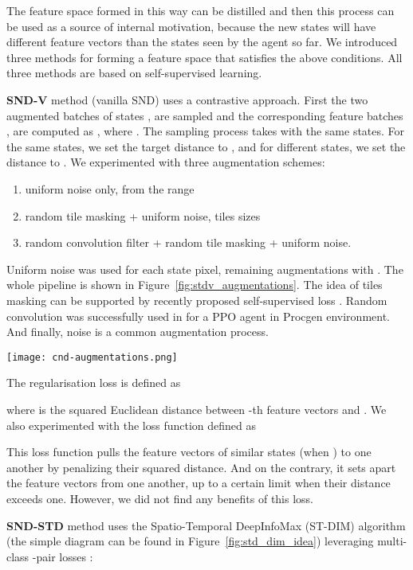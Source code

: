 \documentclass[a4paper,11pt]{elsarticle}
\begin{document}
The feature space formed in this way can be distilled and then this process can be used as a source of internal motivation, because the new states will have different feature vectors than the states seen by the agent so far.
We introduced three methods for forming a feature space that satisfies the above conditions. All three methods are based on self-supervised learning.

\textbf{SND-V} method (vanilla SND) uses a contrastive approach.
First the two augmented batches of states ,  are sampled and the corresponding feature batches ,  are computed as , where .
The sampling process takes with  the same states.
For the same states, we set the target distance to , and for different states, we set the distance to .
We experimented with three augmentation schemes: 
\begin{enumerate}
  \item uniform noise only, from the range 
  \item random tile masking + uniform noise, tiles sizes 
  \item random convolution filter + random tile masking + uniform noise.
\end{enumerate}
Uniform noise was used for each state pixel, remaining augmentations with . The whole pipeline is shown in Figure~\ref{fig:stdv_augmentations}. 
The idea of tiles masking can be supported by recently proposed self-supervised loss \citep{assran2022maskednetworks}. Random convolution was successfully used in \citep{lee2020randomization} for a PPO agent in Procgen environment. And finally, noise is a common augmentation process.
\begin{figure*}
\centering
\texttt{[image: cnd-augmentations.png]}
\caption{The scheme of the state augmentation pipeline.}
\label{fig:stdv_augmentations}
\end{figure*}
The regularisation loss is defined as

where  is the squared Euclidean distance between -{\rm th} feature vectors  and . 
We also experimented with the loss function defined as

This loss function pulls the feature vectors of similar states (when ) to one another by penalizing their squared distance. And on the contrary, it sets apart the feature vectors from one another, up to a certain limit when their distance exceeds one.
However, we did not find any benefits of this loss.

\textbf{SND-STD} method uses the Spatio-Temporal DeepInfoMax (ST-DIM) algorithm \citep{Anand2019} (the simple diagram can be found in Figure~\ref{fig:std_dim_idea}) leveraging multi-class -pair losses \citep{Sohn2016}: 
\end{document}
